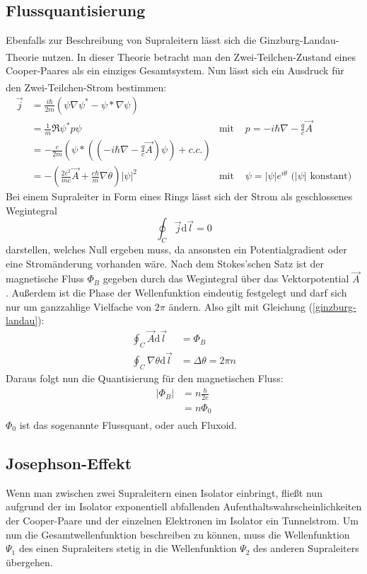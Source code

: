 \documentclass[12pt]{article}
\begin{document}
\subsection{Flussquantisierung}
Ebenfalls zur Beschreibung von Supraleitern lässt sich die Ginzburg-Landau-Theorie\textsuperscript{\cite{anleitung}} nutzen. In dieser Theorie betracht man den Zwei-Teilchen-Zustand eines Cooper-Paares als ein einziges Gesamtsystem. Nun lässt sich ein Ausdruck für den Zwei-Teilchen-Strom bestimmen\textsuperscript{\cite{anleitung}}:
\begin{align}
	\vec j&=\frac{i\hbar}{2m}\left(\psi\nabla\psi^* -\psi*\nabla\psi\right)\\
	&=\frac1m\Re{\psi^*p\psi}&\text{mit }&p=-i\hbar\nabla-\frac qc\vec A\\
	&=-\frac{e}{2m}\left(\psi*\left(\left(-i\hbar\nabla-\frac qc\vec A\right)\psi\right)+c.c.\right)\\
	&=-\left(\frac{2e^2}{mc}\vec A+\frac{e\hbar}{m}\nabla\theta\right)|\psi|^2&\text{mit }&\psi=|\psi|e^{i\theta}\text{ (}|\psi|\text{ konstant)}\label{ginzburg-landau}
\end{align}
Bei einem Supraleiter in Form eines Rings lässt sich der Strom als geschlossenes Wegintegral $$\oint_C\vec j\mathrm d\vec l=0$$ darstellen, welches Null ergeben muss, da ansonsten ein Potentialgradient oder eine Stromänderung vorhanden wäre. Nach dem Stokes'schen Satz ist der magnetische Fluss $\Phi_B$ gegeben durch das Wegintegral über das Vektorpotential $\vec{A}$. Außerdem ist die Phase der Wellenfunktion eindeutig festgelegt und darf sich nur um ganzzahlige Vielfache von $2\pi$ ändern. Also gilt mit Gleichung (\ref{ginzburg-landau}):
\begin{align*}
	\oint_C\vec A\mathrm d\vec l&=\Phi_B\\
	\oint_C\nabla\theta\mathrm d\vec l&=\Delta\theta=2\pi n
\end{align*}
Daraus folgt nun die Quantisierung für den magnetischen Fluss:
\begin{align*}
	|\Phi_B|&=n\frac h{2e}\\
	&=n\Phi_0
\end{align*}
$\Phi_0$ ist das sogenannte Flussquant, oder auch Fluxoid\textsuperscript{\cite{anleitung}}.
\subsection{Josephson-Effekt}
Wenn man zwischen zwei Supraleitern einen Isolator einbringt, fließt nun aufgrund der im Isolator exponentiell abfallenden Aufenthaltswahrscheinlichkeiten der Cooper-Paare und der einzelnen Elektronen im Isolator ein Tunnelstrom. Um nun die Gesamtwellenfunktion beschreiben zu können, muss die Wellenfunktion $\Psi_1$ des einen Supraleiters stetig in die Wellenfunktion $\Psi_2$ des anderen Supraleiters übergehen. 
\end{document}
